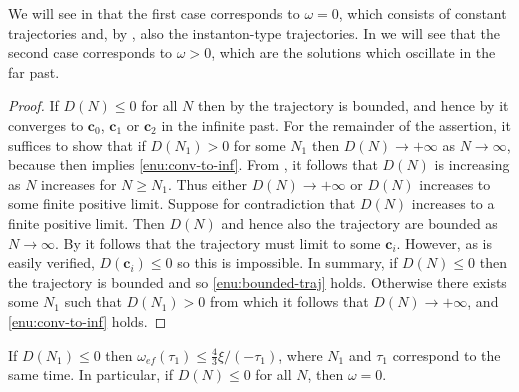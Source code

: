 We will see in  that the first case corresponds to $\omega=0$, which consists of constant trajectories and, by , also the instanton-type trajectories. In  we will see that the second case corresponds to $\omega>0$, which are the solutions which oscillate in the far past.
\begin{proof}
If $D(N)\leq0$ for all $N$ then by  the trajectory is bounded, and hence by  it converges to $\mathbf{c}_{0}$, $\mathbf{c}_{1}$ or $\mathbf{c}_{2}$ in the infinite past. For the remainder of the assertion, it suffices to show that if $D(N_{1})>0$ for some $N_{1}$ then $D(N)\to+\infty$ as $N\to\infty$, because then  implies \ref{enu:conv-to-inf}. From , it follows that $D(N)$ is increasing as $N$ increases for $N\geq N_{1}$. Thus either $D(N)\to+\infty$ or $D(N)$ increases to some finite positive limit. Suppose for contradiction that $D(N)$ increases to a finite positive limit. Then $D(N)$ and hence also the trajectory are bounded as $N\to\infty$. By  it follows that the trajectory must limit to some $\mathbf{c}_{i}$. However, as is easily verified, $D(\mathbf{c}_{i})\leq0$ so this is impossible. In summary, if $D(N)\leq0$ then the trajectory is bounded and so \ref{enu:bounded-traj} holds. Otherwise there exists some $N_{1}$ such that $D(N_{1})>0$ from which it follows that $D(N)\to+\infty$, and \ref{enu:conv-to-inf} holds. 
\end{proof}
\begin{lem}
\label{lem:D-negative-omega-zero}If $D(N_{1})\leq0$ then $\omega_{ef}(\tau_{1})\leq\tfrac{4}{3}\xi/(-\tau_{1})$, where $N_{1}$ and $\tau_{1}$ correspond to the same time. In particular, if $D(N)\leq0$ for all $N$, then $\omega=0$. 
\end{lem}

